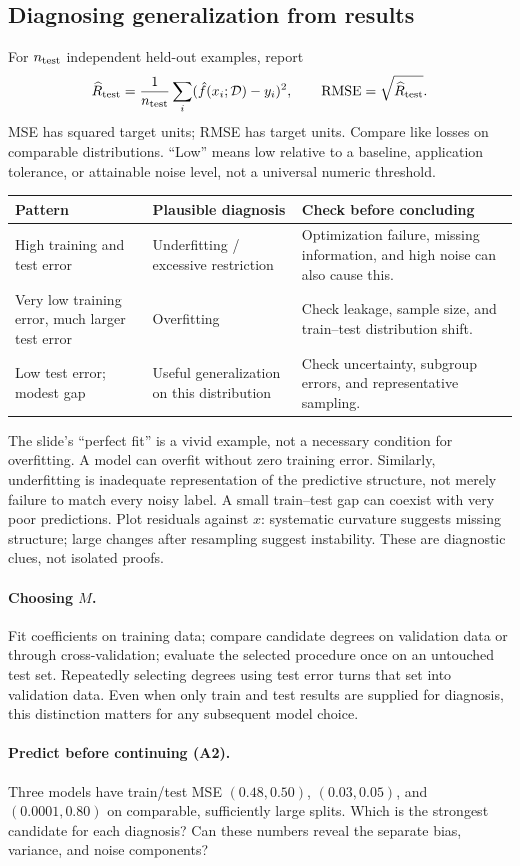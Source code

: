 \subsection{Diagnosing generalization from results}
For $n_{\rm test}$ independent held-out examples, report
\[
\widehat R_{\rm test}=\frac1{n_{\rm test}}\sum_i(\hat f(x_i;\mathcal D)-y_i)^2,
\qquad \mathrm{RMSE}=\sqrt{\widehat R_{\rm test}}.
\]
MSE has squared target units; RMSE has target units. Compare like losses on comparable distributions. ``Low'' means low relative to a baseline, application tolerance, or attainable noise level, not a universal numeric threshold.
\begin{center}\small
\begin{tabular}{p{.24\linewidth}p{.32\linewidth}p{.33\linewidth}}
\toprule Pattern & Plausible diagnosis & Check before concluding\\\midrule
High training and test error & Underfitting / excessive restriction & Optimization failure, missing information, and high noise can also cause this.\\
Very low training error, much larger test error & Overfitting & Check leakage, sample size, and train--test distribution shift.\\
Low test error; modest gap & Useful generalization on this distribution & Check uncertainty, subgroup errors, and representative sampling.\\\bottomrule
\end{tabular}
\end{center}
The slide's ``perfect fit'' is a vivid example, not a necessary condition for overfitting. A model can overfit without zero training error. Similarly, underfitting is inadequate representation of the predictive structure, not merely failure to match every noisy label. A small train--test gap can coexist with very poor predictions. Plot residuals against $x$: systematic curvature suggests missing structure; large changes after resampling suggest instability. These are diagnostic clues, not isolated proofs.

\paragraph{Choosing $M$.} Fit coefficients on training data; compare candidate degrees on validation data or through cross-validation; evaluate the selected procedure once on an untouched test set. Repeatedly selecting degrees using test error turns that set into validation data. Even when only train and test results are supplied for diagnosis, this distinction matters for any subsequent model choice.

\paragraph{Predict before continuing (A2).} Three models have train/test MSE $(0.48,0.50)$, $(0.03,0.05)$, and $(0.0001,0.80)$ on comparable, sufficiently large splits. Which is the strongest candidate for each diagnosis? Can these numbers reveal the separate bias, variance, and noise components?
